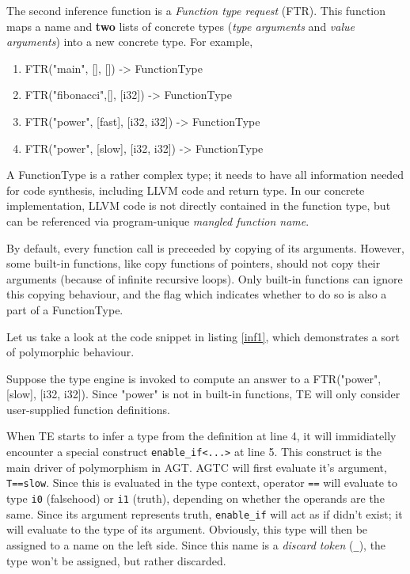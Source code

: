 \documentclass[times, utf8, diplomski]{fer}
\theoremstyle{definition}
\newcommand{\textcode}[3]{
    
}
\begin{document}
The second inference function is a \textit{Function type request} (FTR). This function maps
a name and \textbf{two} lists of concrete types (\textit{type arguments} and \textit{value arguments}) 
into a new concrete type. For example,

\begin{enumerate}
    \item FTR("main", [], []) -> FunctionType
    \item FTR("fibonacci",[], [i32]) -> FunctionType
    \item FTR("power", [fast], [i32, i32]) -> FunctionType
    \item FTR("power", [slow], [i32, i32]) -> FunctionType
\end{enumerate}

A FunctionType is a rather complex type; it needs to have all information needed for code synthesis, 
including LLVM code and return type. In our concrete implementation, LLVM code is not directly
contained in the function type, but can be referenced via program-unique \textit{mangled function name}.

By default, every function call is preceeded by copying of its arguments. However, some built-in functions,
like copy functions of pointers, should not copy their arguments (because of infinite recursive loops).
Only built-in functions can ignore this copying behaviour, and the flag which indicates
whether to do so is also a part of a FunctionType.

Let us take a look at the code snippet in listing \ref{inf1}, 
which demonstrates a sort of polymorphic behaviour.

\textcode{\resdir/compiler/inf1.agt}{inf1}{enable\_if example}

Suppose the type engine is invoked to compute an answer to a FTR("power", [slow], [i32, i32]).
Since "power" is not in built-in functions, TE will only consider user-supplied function definitions.

When TE starts to infer a type from the definition at line 4, it will immidiatelly encounter a special
construct \texttt{enable\_if<...>} at line 5. This construct is the main driver of polymorphism in AGT.
AGTC will first evaluate it's argument, \texttt{T==slow}. Since this is evaluated in the type context,
operator \texttt{==} will evaluate to type \texttt{i0} (falsehood) or \texttt{i1} (truth), depending on 
whether the operands are the same.
Since its argument represents truth, \texttt{enable\_if} will act as if didn't exist;
it will evaluate to the type of its argument.
Obviously, this type will then be assigned to a name on the left side. 
Since this name is a \textit{discard token}
(\texttt{\_}), the type won't be assigned, but rather discarded.
\end{document}
